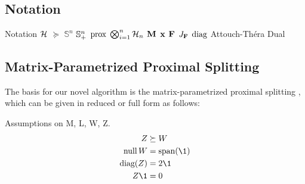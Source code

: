 \subsection{Notation}
Notation
$\mathcal{H}$
$\succeq$
$\mathbb{S}^n$
$\mathbb{S}_+^n$
$\operatorname{prox}$
$\bigotimes_{i=1}^n \mathcal{H}_n$
$\mathbf{M}$
$\mathbf{x}$
$\mathbf{F}$
$J_{\mathbf{F}}$
$\text{diag}$
Attouch-Th\'era Dual
\subsection{Matrix-Parametrized Proximal Splitting}
The basis for our novel algorithm is the matrix-parametrized proximal splitting \cite{bassett2024optimaldesignresolventsplitting}, which can be given in reduced or full form as follows:

Assumptions on M, L, W, Z.
\begin{align}\label{oars}
    Z &\succeq W \\
    \nullspace{W} &= \text{span}(\1)\\
    \text{diag}(Z) &=2\1 \\ 
    Z \1 &= 0
\end{align} 
